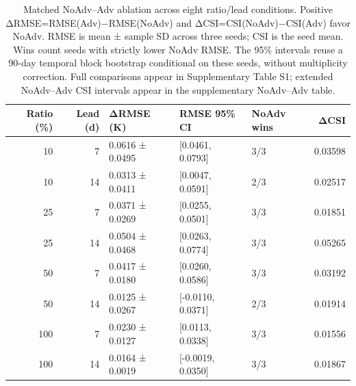 \begin{table}
\caption{Matched NoAdv–Adv ablation across eight ratio/lead conditions. Positive ΔRMSE=RMSE(Adv)−RMSE(NoAdv) and ΔCSI=CSI(NoAdv)−CSI(Adv) favor NoAdv. RMSE is mean ± sample SD across three seeds; CSI is the seed mean. Wins count seeds with strictly lower NoAdv RMSE. The 95\% intervals reuse a 90-day temporal block bootstrap conditional on these seeds, without multiplicity correction. Full comparisons appear in Supplementary Table S1; extended NoAdv–Adv CSI intervals appear in the supplementary NoAdv–Adv table.}
\label{tab:table5_paired}
\begin{tabular}{rrlllr}
\toprule
Ratio (\%) & Lead (d) & ΔRMSE (K) & RMSE 95\% CI & NoAdv wins & ΔCSI \\
\midrule
10 & 7 & 0.0616 ± 0.0495 & [0.0461, 0.0793] & 3/3 & 0.03598 \\
10 & 14 & 0.0313 ± 0.0411 & [0.0047, 0.0591] & 2/3 & 0.02517 \\
25 & 7 & 0.0371 ± 0.0269 & [0.0255, 0.0501] & 3/3 & 0.01851 \\
25 & 14 & 0.0504 ± 0.0468 & [0.0263, 0.0774] & 3/3 & 0.05265 \\
50 & 7 & 0.0417 ± 0.0180 & [0.0260, 0.0586] & 3/3 & 0.03192 \\
50 & 14 & 0.0125 ± 0.0267 & [-0.0110, 0.0371] & 2/3 & 0.01914 \\
100 & 7 & 0.0230 ± 0.0127 & [0.0113, 0.0338] & 3/3 & 0.01556 \\
100 & 14 & 0.0164 ± 0.0019 & [-0.0019, 0.0350] & 3/3 & 0.01867 \\
\bottomrule
\end{tabular}
\end{table}
